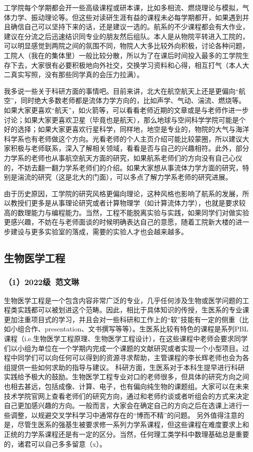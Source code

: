 \documentclass[11pt,oneside]{book}
\begin{document}
工学院每个学期都会开一些高级课程或研本课，比如多相流、燃烧理论与模拟，气体力学、振动理论等。但这些对读研生涯有益的课程未必每学期都开，如果遇到并且确信自己可以坚持下来的话，还是建议一选的。航系的不少课程都会有大作业，建议在分流之后迅速结识同专业的朋友然后组队。本人是从物院平转进入工院的，可以明显感觉到两院之间的氛围不同，物院人大多比较外向积极，讨论各种问题，工院人（我在的集体里）一般比较分散，所以为了在课后时间投入最多的工学院生存下去，大家很有必要积极地向外社交，交换学习资料和心得，相互打气（本人大二真实写照，没有那些同学真的会压力拉满）。

我多说一些关于科研方面的事情吧。目前来讲，北大在航空航天上还是更偏向“航空”，同时绝大多数老师都是流体力学方向的，比如声学、气动、湍流、燃烧等。如果大家更喜欢“航天”，如火箭等，可以看看老师近期的文章或是与老师作进一步讨论；如果大家更喜欢卫星（毕竟也是航天），那么地球与空间科学学院可能是个好的选择；如果大家更喜欢行星科学，同样地，地空是专业的，物院的大气与海洋科学系也有老师做这个方向。光看老师的个人主页介绍可能比较蒙圈，所以建议大家积极与老师联系，深入了解相关领域，看看是否与自己的兴趣相符。此外，部分力学系的老师也从事航空航天方面的研究，如果航系老师们的方向没有自己心仪的，不妨去翻一翻力学系老师们的介绍。如果大家想从事流体力学方面的研究，特别是湍流的研究（这是北大的门面），可以多点了解力学系老师的研究进展。

由于历史原因，工学院的研究风格更偏向理论，这种风格也影响了航系的发展，所以教授们更多是从事理论研究或者计算物理学（如计算流体力学），也就是要求较高的数理能力与编程能力。当然，工程不能脱离实验与实践，如果同学们对做实验更感兴趣，不妨在与老师面谈的时候明确表达自己的意愿，随着工院新大楼的进一步建设与更多实验室的落成，需要的实验人才也会越来越多。

\subsection{生物医学工程}
\subsubsection{（1）2022级\ 范文琳}
生物医学工程是一个包含内容非常广泛的专业，几乎任何涉及生物或医学问题的工程类实践都可以被划进这个范畴。因此，相比于具体知识的传授，生医系的专业课更加注重项目式的学习，并且会对一些科研和工作上的“软”技能有一定的侧重（比如小组合作、presentation、文书撰写等等）。生医系比较有特色的课程是系列PBL课程（i.e.生物医学工程原理、生物医学工程设计），在这些课程中老师会要求同学们以小组为单位在一个学期内完成一个课题的文献研究或者实现一个小型项目。过程中同学们可以向任何可以得到的资源寻求帮助，主管课程的李长辉老师也会为各组提供一些如何求助的指导与建议。
科研方面，生医系对于本科生提早进行科研实践给予极大的鼓励。生物医学工程专业对口的老师很多，但具体的研究方向之间也相去甚远，包括成像、计算、电子，也有偏向纯生物的课题组。大家可以在未来技术学院官网上查看老师们的研究方向，通过和老师约谈或者听组会的方式来决定自己更加感兴趣的方向。一般而言，大家会在确定自己的方向之后在选课上进行一些调整，以规避交叉学科学习中通常存在的“博而不精”的问题。
另外值得注意的是，尽管生医系的强基生被要求修一系列力学系课程，但这些课程在难度要求上和正统的力学系课程还是有一定的区分。当然，任何理工类学科中数理基础总是重要的，诸君可以自己多多留意（x）。
\end{document}
